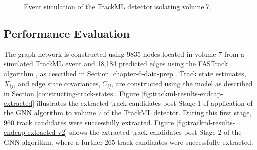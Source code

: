 \begin{figure}[htbp!] 
    \centering
    \hfill%
    \caption{Event simulation of the TrackML detector isolating volume 7.}
    \label{fig:trackml-results-endcap-nodes-sim}
\end{figure}



\subsection{Performance Evaluation}

The graph network is constructed using 9835 nodes located in volume 7 from a simulated TrackML event and 18,184 predicted edges using the FASTrack algorithm \cite{Dmitry-fasttrack-addtest}, as described in Section \ref{chapter-6-data-prep}. Track state estimates, $X_{ij}$, and edge state covariances, $C_{ij}$, are constructed using the model as described in Section \ref{constructing-track-states}. Figure \ref{fig:trackml-results-endcap-extracted} illustrates the extracted track candidates post Stage 1 of application of the GNN algorithm to volume 7 of the TrackML detector. During this first stage, 960 track candidates were successfully extracted. Figure \ref{fig:trackml-results-endcap-extracted-v2} shows the extracted track candidates post Stage 2 of the GNN algorithm, where a further 265 track candidates were successfully extracted.


